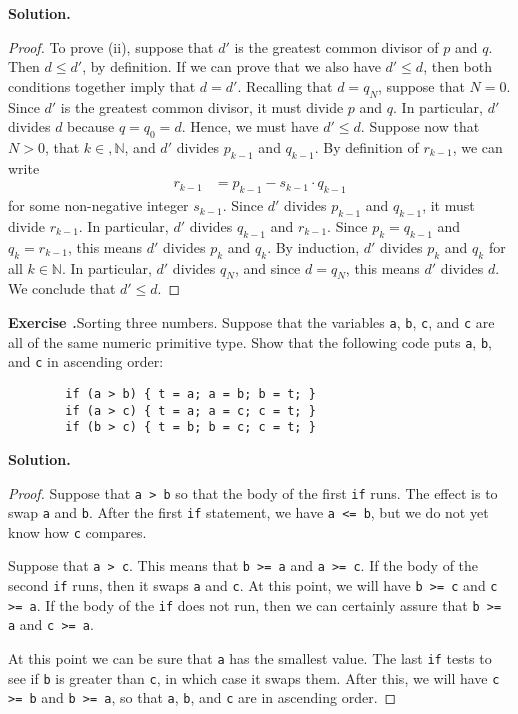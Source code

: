 \documentclass[12pt, a4paper]{article}
\newenvironment{ex}[2][Exercise]
{\par\medskip\noindent \textbf{#1 #2.}}
{\medskip}
\newenvironment{sol}[1][Solution]
{\par\medskip\noindent \textbf{#1.} }
{\medskip}
\begin{document}
\begin{sol}
\begin{proof}
			To prove (ii), suppose that $d'$ is the greatest common divisor of $p$ and $q$.
			Then $d \leq d'$, by definition. If we can prove that we also have $d' \leq d$,
			then both conditions together imply that $d = d'$. Recalling that $d = q_N$,
			suppose that $N = 0$. Since $d'$ is the greatest common divisor, it must divide
			$p$ and $q$. In particular, $d'$ divides $d$ because $q=q_0=d$. Hence, we must
			have $d'\leq d$. Suppose now that $N>0$, that $k\in, \mathbb{N}$, and $d'$ divides
			$p_{k-1}$ and $q_{k-1}$. By  definition of $r_{k-1}$, we can write
			\begin{align*}
				r_{k-1} &= p_{k-1} - s_{k-1}\cdot q_{k-1}
			\end{align*}
			for some non-negative integer $s_{k-1}$. Since $d'$ divides $p_{k-1}$ and $q_{k-1}$,
			it must divide $r_{k-1}$. In particular, $d'$ divides $q_{k-1}$ and
			$r_{k-1}$. Since $p_k = q_{k-1}$ and $q_k = r_{k-1}$, this means $d'$ divides
			$p_k$ and $q_k$. By induction, $d'$  divides $p_k$ and $q_k$ for all $k\in\mathbb{N}$.
			In particular, $d'$ divides $q_N$, and since $d = q_N$, this means $d'$ divides $d$.
			We conclude that $d' \leq d$.
		\end{proof}
	\end{sol}
	\begin{ex}{26}
		\emph{Sorting three numbers}. Suppose that the variables \texttt{a}, \texttt{b},
		\texttt{c}, and \texttt{c} are all of the same numeric primitive type. Show that
		the following code puts \texttt{a}, \texttt{b}, and \texttt{c} in ascending order:
		\begin{lstlisting}
		if (a > b) { t = a; a = b; b = t; }
		if (a > c) { t = a; a = c; c = t; }
		if (b > c) { t = b; b = c; c = t; }
		\end{lstlisting}
	\end{ex}
	\begin{sol}
		\begin{proof}
			Suppose that \texttt{a > b} so that the body of the first \texttt{if} runs.
			The effect is to swap \texttt{a} and \texttt{b}. After the first \texttt{if}
			statement, we have \texttt{a <= b}, but we do not yet know how \texttt{c} compares.
			
			Suppose that \texttt{a > c}. This means that \texttt{b >= a} and \texttt{a >= c}.
			If the body of the second \texttt{if} runs, then it swaps \texttt{a} and \texttt{c}.
			At this point, we will have \texttt{b >= c} and \texttt{c >= a}. If the body of
			the \texttt{if} does not run, then we can certainly assure that \texttt{b >= a}
			and \texttt{c >= a}.
			
			At this point we can be sure that \texttt{a} has the smallest value. The last
			\texttt{if} tests to see if \texttt{b} is greater than \texttt{c}, in which case
			it swaps them. After this, we will have \texttt{c >= b} and \texttt{b >= a},
			so that \texttt{a}, \texttt{b}, and \texttt{c} are in ascending order.
		\end{proof}
	\end{sol}
\end{document}
